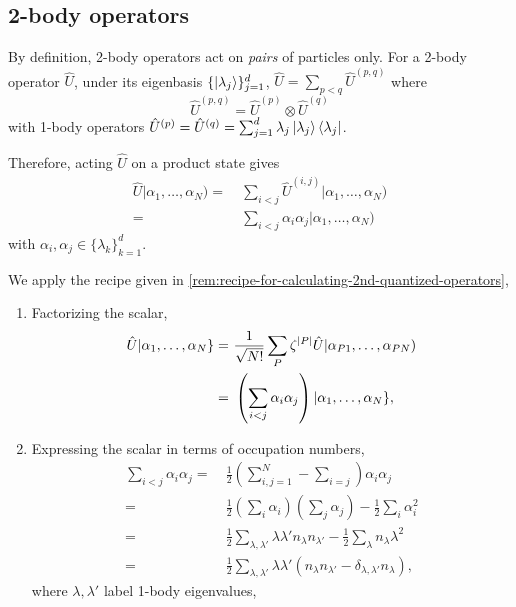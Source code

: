 \documentclass{article}
\theoremstyle{definition}
\numberwithin{equation}{section}
\begin{document}
\subsection{2-body operators}

By definition, 2-body operators act on 
\emph{pairs} of particles only. 
For a 2-body operator $\hat{U}$, under its 
eigenbasis 
$\{\ket{\lambda_{j}}\}_{j=1}^{d}$, 
$\hat{U}=\sum_{p < q}\hat{U}^{(p,q)}$ where  
\[
    \hat{U}^{(p,q)}=\hat{U}^{(p)}\otimes \hat{U}^{(q)}
\]
with 1-body operators 
$\hat{U}^{(p)}=\hat{U}^{(q)}=
\sum_{j=1}^{d}\lambda_{j} \ket{\lambda_{j}}
\bra{\lambda_{j}}$. 

Therefore, acting $\hat{U}$ on a product state gives 
\begin{align*}
    \hat{U}
    |\alpha_1, \ldots ,\alpha_{N})
    =&\ 
    \sum_{i<j}
    \hat{U}^{(i,j)}
    |\alpha_1, \ldots ,\alpha_{N}) \\
    =&\ 
    \sum_{i<j}
    \alpha_{i}\alpha_{j}
    |\alpha_1, \ldots ,\alpha_{N})
\end{align*}
with 
$\alpha_{i},\alpha_{j} 
\in 
\{\lambda_{k}\}_{k=1}^{d}$.

We apply the recipe given in 
\cref{rem:recipe-for-calculating-2nd-quantized-operators},

\begin{enumerate}
    \item Factorizing the scalar,
    \begin{align*}
        \hat{U} 
        |\alpha_1, \ldots ,\alpha_{N}\}
        =&\ 
        \frac{1}{\sqrt{N!}}
        \sum_{P}\zeta^{\abs{P}}
        \hat{U}
        |\alpha_{P1}, \ldots ,\alpha_{PN}) \\
        =&\ 
        \left( 
            \sum_{i<j}
            \alpha_{i}\alpha_{j}
         \right) 
        |\alpha_{1}, \ldots ,\alpha_{N}\},
    \end{align*}
    \item Expressing the scalar 
    in terms of occupation numbers,
    \begin{align*}
        \sum_{i<j}
        \alpha_{i}\alpha_{j}
        =&\ 
        \frac{1}{2}
        \left( 
            \sum_{i,j=1}^{N}
            -
            \sum_{i=j}
         \right) 
        \alpha_{i}\alpha_{j} \\
        =&\ 
        \frac{1}{2}
        (\sum_{i}\alpha_{i})
        (\sum_{j}\alpha_{j})
        -
        \frac{1}{2}\sum_{i}\alpha_{i}^{2} \\
        =&\ 
        \frac{1}{2}\sum_{\lambda,\lambda'}
        \lambda \lambda' 
        n_{\lambda} n_{\lambda '}
        -
        \frac{1}{2}
        \sum_{\lambda} n_{\lambda} \lambda^{2} \\
        =&\ 
        \frac{1}{2}\sum_{\lambda,\lambda'}
        \lambda \lambda '
        (
            n_{\lambda} n_{\lambda '}
            -
            \delta_{\lambda,\lambda '}
            n_{\lambda}
        ),
    \end{align*}
    where $\lambda, \lambda'$ label 
    1-body eigenvalues,
\end{enumerate}
\end{document}
